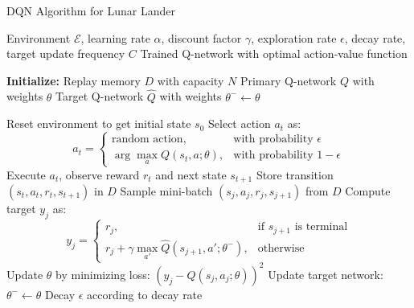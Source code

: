 \documentclass[conference]{IEEEtran}
\begin{document}
	\begin{algorithm}[H]
		\caption{DQN Algorithm for Lunar Lander}
		\begin{algorithmic}
			\Require Environment $\mathcal{E}$, learning rate $\alpha$, discount factor $\gamma$, exploration rate $\epsilon$, decay rate, target update frequency $C$
			\Ensure Trained Q-network with optimal action-value function
			
			\State \textbf{Initialize:}
			\State Replay memory $D$ with capacity $N$
			\State Primary Q-network $Q$ with weights $\theta$
			\State Target Q-network $\hat{Q}$ with weights $\theta^{-} \leftarrow \theta$
			
			\State Reset environment to get initial state $s_0$
			\State Select action $a_t$ as:
			\[ 
			a_t = 
			\begin{cases} 
				\text{random action,} & \text{with probability } \epsilon \\ 
				\arg\max_a Q(s_t, a; \theta), & \text{with probability } 1 - \epsilon 
			\end{cases}
			\]
			\State Execute $a_t$, observe reward $r_t$ and next state $s_{t+1}$
			\State Store transition $(s_t, a_t, r_t, s_{t+1})$ in $D$
			\State Sample mini-batch $(s_j, a_j, r_j, s_{j+1})$ from $D$
			\State Compute target $y_j$ as:
			\[
			y_j = 
			\begin{cases} 
				r_j, & \text{if } s_{j+1} \text{ is terminal} \\ 
				r_j + \gamma \max_{a'} \hat{Q}(s_{j+1}, a'; \theta^{-}), & \text{otherwise} 
			\end{cases}
			\]
			\State Update $\theta$ by minimizing loss: $\left( y_j - Q(s_j, a_j; \theta) \right)^2$
			\EndIf
			\State Update target network: $\theta^{-} \leftarrow \theta$
			\EndIf
			\EndFor
			\State Decay $\epsilon$ according to decay rate
			\EndFor
		\end{algorithmic}
	\end{algorithm}
\end{document}
